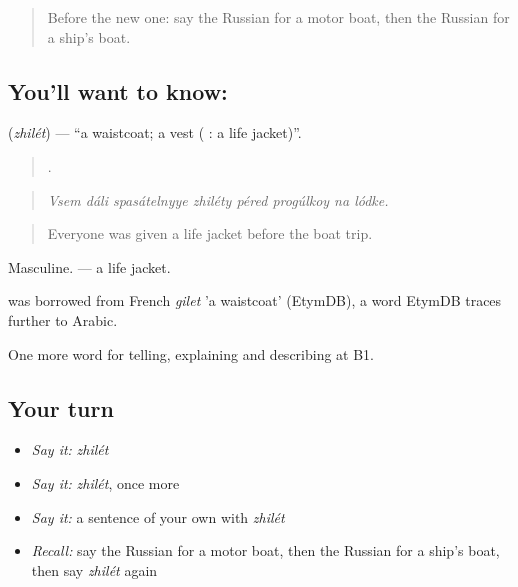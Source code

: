 \label{lesson:RU-C426-zhilet}



\begin{quote}
Before the new one: say the Russian for a motor boat, then the Russian for a ship's boat.
\end{quote}

\subsection*{You'll want to know: }
\textbf{} (\emph{zhilét}) — \textquotedblleft{}a waistcoat; a vest ( : a life jacket)\textquotedblright{}.

\begin{quote}
       .
\end{quote}

\begin{quote}
\emph{Vsem dáli spasátelnyye zhiléty péred progúlkoy na lódke.}
\end{quote}

\begin{quote}
Everyone was given a life jacket before the boat trip.
\end{quote}

Masculine. \emph{ } — a life jacket.

\begin{cousinweb}
\emph{} was borrowed from French \emph{gilet} 'a waistcoat' (EtymDB), a word EtymDB traces further to Arabic.
\end{cousinweb}

\begin{grammarlens}[title={What you've built}]
One more word for telling, explaining and describing at B1.
\end{grammarlens}

\subsection*{Your turn}
\begin{itemize}
\raggedright
  \item \emph{Say it:} \emph{zhilét}
  \item \emph{Say it:} \emph{zhilét}, once more
  \item \emph{Say it:} a sentence of your own with \emph{zhilét}
  \item \emph{Recall:} say the Russian for a motor boat, then the Russian for a ship's boat, then say \emph{zhilét} again
\end{itemize}

